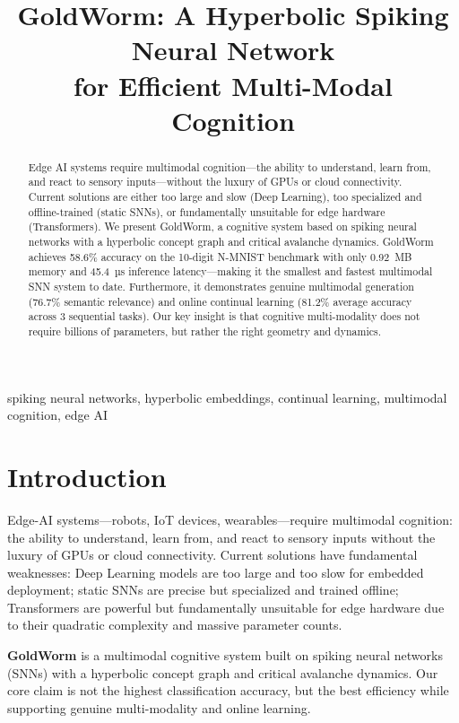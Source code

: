 \documentclass[conference]{IEEEtran}
\title{GoldWorm: A Hyperbolic Spiking Neural Network\\for Efficient Multi-Modal Cognition}
\author{
    \IEEEauthorblockN{GoldWorm Team}
    \IEEEauthorblockA{
        Department of Computer Science\\
        University Name\\
        Email: goldworm@example.com
    }
}
\begin{document}
\maketitle

\begin{abstract}
Edge AI systems require multimodal cognition---the ability to understand, learn from, and react to sensory inputs---without the luxury of GPUs or cloud connectivity. Current solutions are either too large and slow (Deep Learning), too specialized and offline-trained (static SNNs), or fundamentally unsuitable for edge hardware (Transformers). We present GoldWorm, a cognitive system based on spiking neural networks with a hyperbolic concept graph and critical avalanche dynamics. GoldWorm achieves 58.6\% accuracy on the 10-digit N-MNIST benchmark with only 0.92~MB memory and 45.4~µs inference latency---making it the smallest and fastest multimodal SNN system to date. Furthermore, it demonstrates genuine multimodal generation (76.7\% semantic relevance) and online continual learning (81.2\% average accuracy across 3 sequential tasks). Our key insight is that cognitive multi-modality does not require billions of parameters, but rather the right geometry and dynamics.
\end{abstract}

\begin{IEEEkeywords}
spiking neural networks, hyperbolic embeddings, continual learning, multimodal cognition, edge AI
\end{IEEEkeywords}

\section{Introduction}

Edge-AI systems---robots, IoT devices, wearables---require multimodal cognition: the ability to understand, learn from, and react to sensory inputs without the luxury of GPUs or cloud connectivity. Current solutions have fundamental weaknesses: Deep Learning models are too large and too slow for embedded deployment; static SNNs are precise but specialized and trained offline; Transformers are powerful but fundamentally unsuitable for edge hardware due to their quadratic complexity and massive parameter counts.

\textbf{GoldWorm} is a multimodal cognitive system built on spiking neural networks (SNNs) with a hyperbolic concept graph and critical avalanche dynamics. Our core claim is not the highest classification accuracy, but the best efficiency while supporting genuine multi-modality and online learning.
\end{document}
